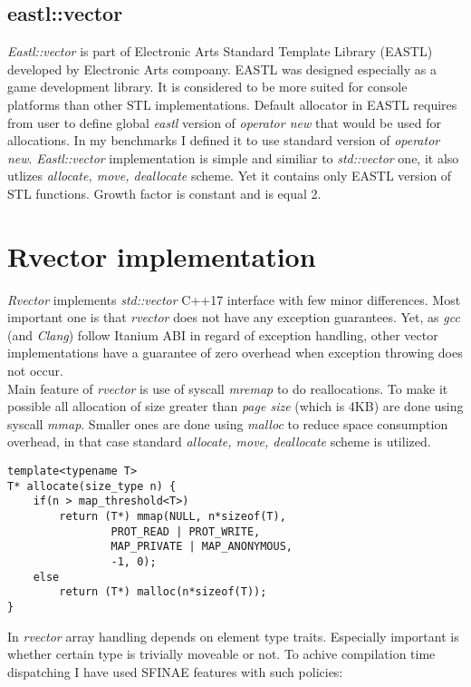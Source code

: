 \documentclass[inz, english, shortabstract]{iithesis}
\begin{document}
\section{eastl::vector}
{\it Eastl::vector}\cite{eastl::vector_impl} is part of Electronic Arts Standard Template Library (EASTL) developed by Electronic Arts compoany. EASTL was designed especially as a game development library. It is considered to be more suited for console platforms\cite{eastl_faq} than other STL implementations. Default allocator in EASTL requires from user to define global {\it eastl} version of {\it operator new} that would be used for allocations. In my benchmarks I defined it to use standard version of {\it operator new}. {\it Eastl::vector} implementation is simple and similiar to {\it std::vector} one, it also utlizes {\it allocate, move, deallocate} scheme. Yet it contains only EASTL version of STL functions. Growth factor is constant and is equal 2.  


\chapter{Rvector implementation}
{\it Rvector}\cite{rvector_impl} implements {\it std::vector} C++17 interface with few minor differences. Most important one is that {\it rvector} does not have any exception guarantees. Yet, as {\it gcc} (and {\it Clang}) follow Itanium ABI\cite{Itanium_ABI} in regard of exception handling, other vector implementations have a guarantee of zero overhead when exception throwing does not occur. \\
Main feature of {\it rvector} is use of syscall {\it mremap} to do reallocations. To make it possible all allocation of size greater than {\it page size} (which is 4KB) are done using syscall {\it mmap}. Smaller ones are done using {\it malloc} to reduce space consumption overhead, in that case standard {\it allocate, move, deallocate} scheme is utilized.

\begin{lstlisting}[caption=rvector allocation]
template<typename T>
T* allocate(size_type n) {
	if(n > map_threshold<T>)
    	return (T*) mmap(NULL, n*sizeof(T), 
                PROT_READ | PROT_WRITE,
                MAP_PRIVATE | MAP_ANONYMOUS,
                -1, 0);
    else
    	return (T*) malloc(n*sizeof(T));
}
\end{lstlisting}
In {\it rvector} array handling depends on element type traits. Especially important is whether certain type is trivially moveable or not. To achive compilation time dispatching I have used SFINAE features with such policies:
\end{document}
